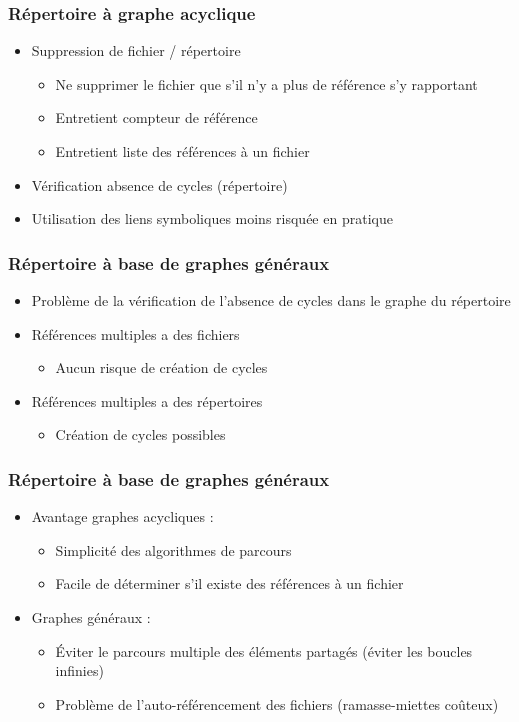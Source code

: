\begin{frame}
\frametitle{Répertoire à graphe acyclique}
\begin{itemize}
\item Suppression de fichier / répertoire
\begin{itemize}
\item Ne supprimer le fichier que s'il n'y a plus de référence s'y rapportant
\item Entretient compteur de référence
\item Entretient liste des références à un fichier
\end{itemize}
\item Vérification absence de cycles (répertoire)
\item Utilisation des liens symboliques moins risquée en pratique
\end{itemize}
\end{frame}

\begin{frame}
\frametitle{Répertoire à base de graphes généraux}
\begin{itemize}
\item Problème de la vérification de l'absence de cycles dans le graphe du répertoire
\item Références multiples a des fichiers
\begin{itemize}
\item Aucun risque de création de cycles
\end{itemize}
\item Références multiples a des répertoires
\begin{itemize}
\item Création de cycles possibles
\end{itemize}
\end{itemize}
\end{frame}

\begin{frame}
\frametitle{Répertoire à base de graphes généraux}
\begin{itemize}
\item Avantage graphes acycliques :
\begin{itemize}
\item Simplicité des algorithmes de parcours
\item Facile de déterminer s'il existe des références à un fichier
\end{itemize}
\item Graphes généraux :
\begin{itemize}
\item Éviter le parcours multiple des éléments partagés (éviter les boucles infinies)
\item Problème de l'auto-référencement des fichiers (ramasse-miettes coûteux)
\end{itemize}
\end{itemize}
\end{frame}

